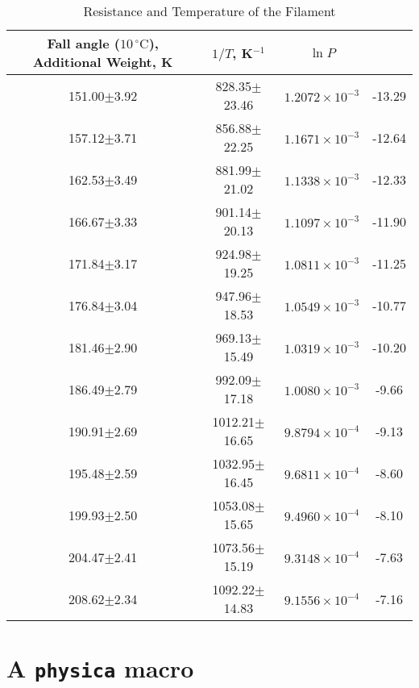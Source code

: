 \documentclass[12pt]{article}
\begin{document}
    \begin{table}[h]
    \caption{Resistance and Temperature of the Filament}
    \label{tab:data}
    \vspace{0.15in}
    \begin{center}
    \begin{tabular}{|c|c|c|c|}
    \hline
    Fall angle ($10\,^{\circ}\mathrm{C}$), Additional Weight, K & $1/T$, K$^{-1}$ & $\ln P$ \\
    \hline
    151.00$\pm$3.92 & 828.35$\pm$23.46& $1.2072\times10^{-3}$& -13.29 \\
    157.12$\pm$3.71 & 856.88$\pm$22.25& $1.1671\times10^{-3}$& -12.64 \\
    162.53$\pm$3.49 & 881.99$\pm$21.02& $1.1338\times10^{-3}$& -12.33 \\
    166.67$\pm$3.33 & 901.14$\pm$20.13& $1.1097\times10^{-3}$& -11.90 \\
    171.84$\pm$3.17 & 924.98$\pm$19.25& $1.0811\times10^{-3}$& -11.25 \\ 
    176.84$\pm$3.04 & 947.96$\pm$18.53& $1.0549\times10^{-3}$& -10.77 \\
    181.46$\pm$2.90 & 969.13$\pm$15.49& $1.0319\times10^{-3}$& -10.20 \\
    186.49$\pm$2.79 & 992.09$\pm$17.18& $1.0080\times10^{-3}$& -9.66 \\
    190.91$\pm$2.69 & 1012.21$\pm$16.65& $9.8794\times10^{-4}$& -9.13 \\
    195.48$\pm$2.59 & 1032.95$\pm$16.45& $9.6811\times10^{-4}$& -8.60 \\
    199.93$\pm$2.50 & 1053.08$\pm$15.65& $9.4960\times10^{-4}$& -8.10 \\
    204.47$\pm$2.41 & 1073.56$\pm$15.19& $9.3148\times10^{-4}$& -7.63 \\
    208.62$\pm$2.34 & 1092.22$\pm$14.83& $9.1556\times10^{-4}$& -7.16 \\
    \hline
    \end{tabular}
    \end{center}  
    \end{table}

    \newpage
    \section{A {\tt physica} macro}
\end{document}
